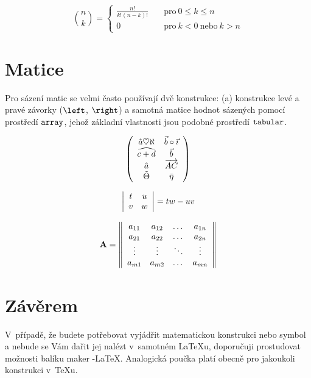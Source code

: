 \documentclass[10pt]{proc}
\theoremstyle{ity}
\begin{document}
$$\binom{n}{k} =
\left\{
	\begin{array}{ll}
		\frac{n!}{k!(n - k)!} & \quad \mathrm{pro} \ 0 \leq k \leq n \\
		0 & \quad \mathrm{pro} \ k < 0 \ \mathrm{nebo} \ k > n
	\end{array}
\right.$$

\section{Matice}

Pro sázení matic se velmi často používají dvě konstrukce:
(a) konstrukce levé a pravé závorky ($\verb!\left!$, $\verb!\right!$) a
samotná matice hodnot sázených pomocí prostředí $\verb!array!$, jehož základní vlastnosti jsou podobné
prostředí $\verb!tabular!$.

$$\left(
	\begin{array}{c c}
		\hat{a}\heartsuit\aleph & \vec{b} \circ \vec{\imath}\\
		\widehat{c + d} & \vec{b} \\
		\hat{a} & \overrightarrow{AC} \\
		\tilde{\Theta} & \bar{\eta}
	\end{array}
\right)$$

$$\left|
	\begin{array}{c c}
		t & u \\
		v & w
	\end{array}
\right| = tw - uv$$

$$\mathbf{A} = \left\lVert
	\begin{array}{c c c c}
		 a_{11} & a_{12} & \dots & a_{1n} \\
		 a_{21} & a_{22} & \dots & a_{2n} \\
		 \vdots & \vdots & \ddots & \vdots \\
		 a_{m1} & a_{m2} & \dots & a_{mn}
	\end{array}
\right\rVert$$

\section{Závěrem}
V~případě, že budete potřebovat vyjádřit matematickou konstrukci nebo symbol a nebude se Vám dařit jej
nalézt v~samotném \LaTeX{u}, doporučuji prostudovat možnosti balíku maker \AmS-\LaTeX.
Analogická poučka platí obecně pro jakoukoli konstrukci v~\TeX{u}.
\end{document}
